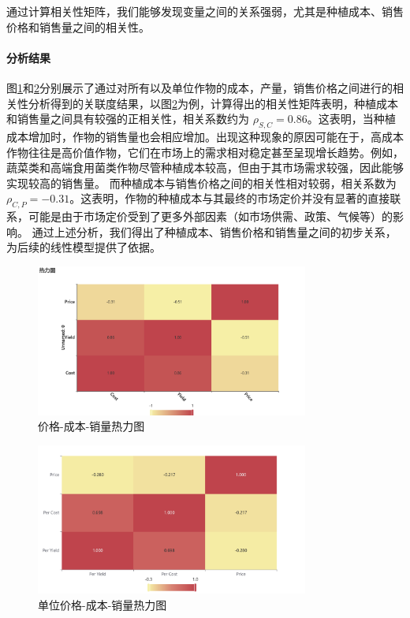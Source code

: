 \documentclass[12pt,a4paper]{nmmcm}
\begin{document}
通过计算相关性矩阵，我们能够发现变量之间的关系强弱，尤其是种植成本、销售价格和销售量之间的相关性。

\paragraph{分析结果}

图\ref{fig:heatmap}和\ref{fig:heatmap2}分别展示了通过对所有以及单位作物的成本，产量，销售价格之间进行的相关性分析得到的关联度结果，以图\ref{fig:heatmap2}为例，计算得出的相关性矩阵表明，种植成本和销售量之间具有较强的正相关性，相关系数约为 $\rho_{S,C} = 0.86$。这表明，当种植成本增加时，作物的销售量也会相应增加。出现这种现象的原因可能在于，高成本作物往往是高价值作物，它们在市场上的需求相对稳定甚至呈现增长趋势。例如，蔬菜类和高端食用菌类作物尽管种植成本较高，但由于其市场需求较强，因此能够实现较高的销售量。
而种植成本与销售价格之间的相关性相对较弱，相关系数为 $\rho_{C,P} = -0.31$。这表明，作物的种植成本与其最终的市场定价并没有显著的直接联系，可能是由于市场定价受到了更多外部因素（如市场供需、政策、气候等）的影响。
通过上述分析，我们得出了种植成本、销售价格和销售量之间的初步关系，为后续的线性模型提供了依据。

\begin{figure}[H]
  \centering
  \includegraphics[width=0.8\textwidth]{figures/prob3/correlation/价格_成本_销量热力图.png}
  \caption{价格-成本-销量热力图}
  \label{fig:heatmap}
\end{figure}

\begin{figure}[H]
  \centering
  \includegraphics[width=0.8\textwidth]{figures/prob3/correlation/单位价格_成本_销量热力图.png}
  \caption{单位价格-成本-销量热力图}
  \label{fig:heatmap2}
\end{figure}
\end{document}

